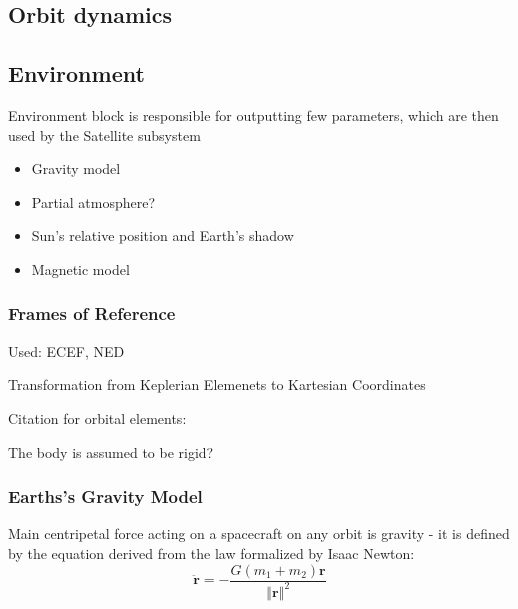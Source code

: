 \subsection{Orbit dynamics}

\subsection{Environment}
    Environment block is responsible for outputting few parameters, which are then used by the Satellite subsystem
    \begin{itemize}
        \item Gravity model
        \item Partial atmosphere?
        \item Sun's relative position and Earth's shadow
        \item Magnetic model
    \end{itemize}

    \subsubsection{Frames of Reference}
        Used: ECEF, NED

        Transformation from Keplerian Elemenets to Kartesian Coordinates


    Citation for orbital elements: \cite{vallado2001fundamentals}

    The body is assumed to be rigid?

    \subsubsection{Earths's Gravity Model}

        Main centripetal force acting on a spacecraft on any orbit is gravity - it is defined by the equation derived from the law formalized by Isaac Newton:
        \begin{equation}
            \ddot{\textbf{r}} = -\frac{G(m_1+m_2)\textbf{r}}{\left\Vert \textbf{r} \right\Vert^2}
        \end{equation}

